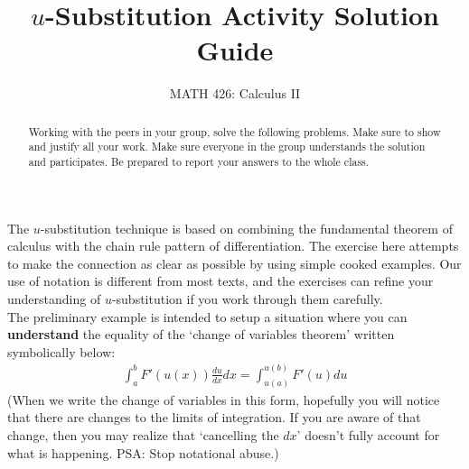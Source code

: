 \documentclass{ximera}
\title{$u$-Substitution Activity Solution Guide}
\author{MATH 426: Calculus II}
\begin{document}
\begin{abstract}
   Working with the peers in your group, solve the following problems. Make sure to show and justify all your work. Make sure everyone in the group understands the solution and participates. Be prepared to report your answers to the whole class. 
\end{abstract}
\maketitle

The $u$-substitution technique is based on combining the fundamental theorem of calculus with the chain rule pattern of differentiation. The exercise here attempts to make the connection as clear as possible by using simple cooked examples. Our use of notation is different from most texts, and the exercises can refine your understanding of $u$-substitution if you work through them carefully.\\

The preliminary example is intended to setup a situation where you can {\bf{understand}} the equality of the `change of variables theorem' written symbolically below:
\begin{align}
	\int_{a}^b F'(u(x))\frac{du}{dx} dx = \int_{u(a)}^{u(b)} F'(u)du \nonumber
\end{align}
(When we write the change of variables in this form, hopefully you will notice that there are changes to the limits of integration. If you are aware of that change, then you may realize that `cancelling the $dx$' doesn't fully account for what is happening. PSA: Stop notational abuse.)
\end{document}
